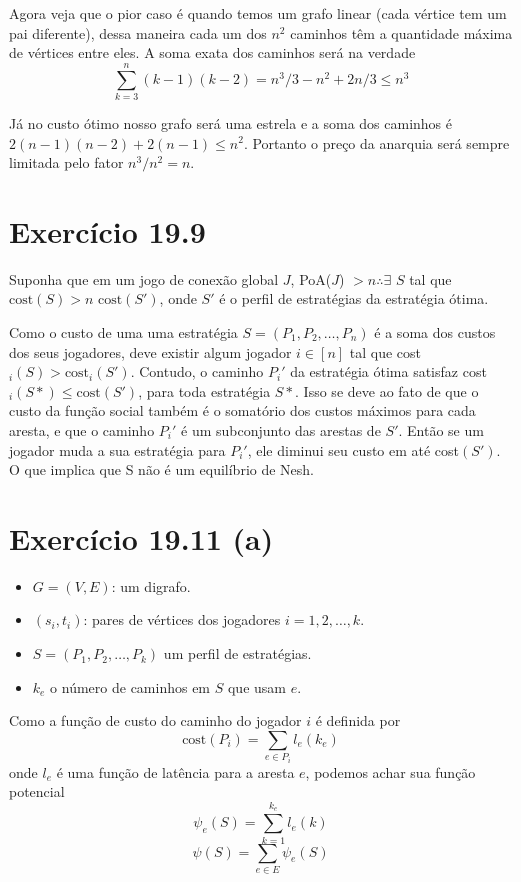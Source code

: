 \documentclass[12pt, letterpaper]{article}
\begin{document}
	Agora veja que o pior caso é quando temos um grafo linear (cada vértice tem um pai diferente), dessa maneira cada um dos $n^2$ caminhos têm a quantidade máxima de vértices entre eles. A soma exata dos caminhos será na verdade
	$$
	\sum_{k = 3}^{n}{(k - 1)(k - 2)} = n^3 / 3 - n^2 + 2n / 3 \leq n^3
	$$

	Já no custo ótimo nosso grafo será uma estrela e a soma dos caminhos é $2(n-1)(n-2) + 2(n - 1) \leq n^2$. Portanto o preço da anarquia será sempre limitada pelo fator $n^3 / n^2 = n$.

\section{Exercício 19.9}
	Suponha que em um jogo de conexão global $J$, PoA($J$) $> n \therefore \exists$ $S$ tal que $ \textrm{cost}(S) > n \textrm{ cost}(S')$, onde $S'$ é o perfil de estratégias da estratégia ótima.

	Como o custo de uma uma estratégia $S = (P_1, P_2, \ldots, P_n)$ é a soma dos custos dos seus jogadores, deve existir algum jogador $i \in [n]$ tal que cost$_i(S) > \textrm{cost}_i(S')$. Contudo, o caminho $P_i'$ da estratégia ótima satisfaz cost$_i(S*) \leq \textrm{cost}(S')$, para toda estratégia $S*$. Isso se deve ao fato de que o custo da função social também é o somatório dos custos máximos para cada aresta, e que o caminho $P_i'$ é um subconjunto das arestas de $S'$. Então se um jogador muda a sua estratégia para $P_i'$, ele diminui seu custo em até cost$(S')$. O que implica que S não é um equilíbrio de Nesh.

\section{Exercício 19.11 (a)}
	\begin{itemize}
		\item{$G = (V, E)$: um digrafo.}
		\item{$(s_i, t_i)$: pares de vértices dos jogadores $i = 1, 2, \ldots, k$.}
		\item{$S = (P_1, P_2, \ldots, P_k)$ um perfil de estratégias.}
		\item{$k_e$ o número de caminhos em $S$ que usam $e$.}
	\end{itemize}

	Como a função de custo do caminho do jogador $i$ é definida por
	$$
		\textrm{cost}(P_i) = \sum_{e \in P_i}{l_e(k_e)}
	$$
	onde $l_e$ é uma função de latência para a aresta $e$, podemos achar sua função potencial
	$$
		\psi_e(S) = \sum_{k = 1}^{k_e}{l_e(k)}
	$$$$
		\psi(S) = \sum_{e \in E}{\psi_e(S)}
	$$
\end{document}
